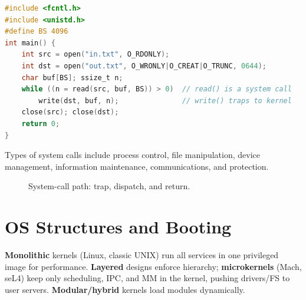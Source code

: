 \begin{lstlisting}[language=C,caption={System-call usage: copy a file (POSIX)}]
#include <fcntl.h>
#include <unistd.h>
#define BS 4096
int main() {
    int src = open("in.txt", O_RDONLY);
    int dst = open("out.txt", O_WRONLY|O_CREAT|O_TRUNC, 0644);
    char buf[BS]; ssize_t n;
    while ((n = read(src, buf, BS)) > 0)  // read() is a system call
        write(dst, buf, n);               // write() traps to kernel
    close(src); close(dst);
    return 0;
}
\end{lstlisting}

Types of system calls include process control, file manipulation, device
management, information maintenance, communications, and protection.

\begin{figure}[h!]
\centering
{}
\caption{System-call path: trap, dispatch, and return.}
\label{fig:syscall-path}
\end{figure}

\section{OS Structures and Booting}
\label{sec:structures}

\textbf{Monolithic} kernels (Linux, classic UNIX) run all services in one
privileged image for performance. \textbf{Layered} designs enforce hierarchy;
\textbf{microkernels} (Mach, seL4) keep only scheduling, IPC, and MM in the
kernel, pushing drivers/FS to user servers. \textbf{Modular/hybrid} kernels
load modules dynamically.

